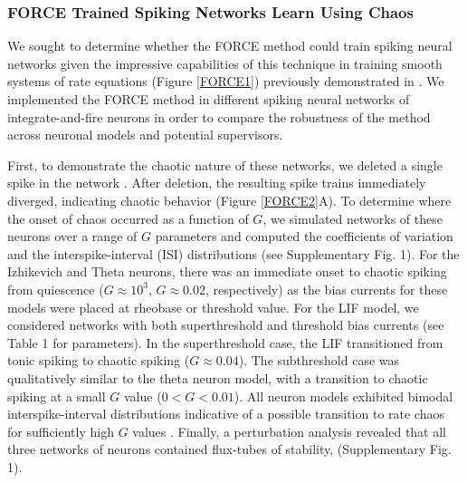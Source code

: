 \documentclass[11pt]{article} %
\begin{document}
\subsubsection*{FORCE Trained Spiking Networks Learn Using Chaos} 


We sought to determine whether the FORCE method could train spiking neural networks given the impressive capabilities of this technique in training smooth systems of rate equations (Figure \ref{FORCE1}) previously demonstrated in \cite{FORCE1}.  We implemented the FORCE method in different spiking neural networks of integrate-and-fire neurons in order to compare the robustness of the method across neuronal models and potential supervisors.  


 First, to demonstrate the chaotic nature of these networks, we deleted a single spike in the network \cite{London}.  After deletion, the resulting spike trains immediately diverged, indicating chaotic behavior  (Figure \ref{FORCE2}A).  To determine where the onset of chaos occurred as a function of $G$, we simulated networks of these neurons over a range of $G$ parameters and computed the coefficients of variation and the interspike-interval (ISI) distributions (see Supplementary Fig. 1).  For the Izhikevich and Theta neurons, there was an immediate onset to chaotic spiking from quiescence ($G \approx 10^3$, $G\approx 0.02$, respectively) as the bias currents for these models were placed at rheobase or threshold value.  For the LIF model, we considered networks with both superthreshold and threshold bias currents (see Table 1 for parameters).  In the superthreshold case, the LIF transitioned from tonic spiking to chaotic spiking ($G\approx 0.04$).  The subthreshold case was qualitatively similar to the theta neuron model, with a transition to chaotic spiking at a small $G$ value ($0<G<0.01$).  
All neuron models exhibited bimodal interspike-interval distributions indicative of a possible transition to rate chaos for sufficiently high $G$ values \cite{OSTOJIC,Harish}.  Finally, a perturbation analysis revealed that all three networks of neurons contained flux-tubes of stability, \cite{fluxtube} (Supplementary Fig. 1). 


\end{document}

